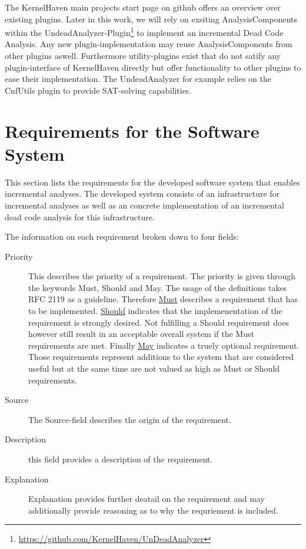 \documentclass[a4paper]{article}
\begin{document}
The KernelHaven main projects start page on github offers an overview over existing plugins. Later in this work, we will rely on exsiting AnalysisComponents within the UndeadAnalyzer-Plugin\footnote{\url{https://github.com/KernelHaven/UnDeadAnalyzer}} to implement an incremental Dead Code Analysis. Any new plugin-implementation may reuse AnalysisComponents from other plugins aswell. Furthermore utility-plugins exist that do not satify any plugin-interface of KernelHaven directly but offer functionality to other plugins to ease their implementation. The UndeadAnalyzer for example relies on the CnfUtils plugin to provide SAT-solving capabilities.

\newpage
\section{Requirements for the Software System}

This section lists the requirements for the developed software system that enables incremental analyses. The developed system consists of an infrastructure for incremental analyses as well as an concrete implementation of an incremental dead code analysis for this infrastructure.

The information on each requirement broken down to four fields:

\begin{description}
    \item [Priority]
	This describes the priority of a requirement. The priority is given through the keywords Must, Should and May. The usage of the definitions takes RFC 2119 \cite{RFC-bum} as a guideline. Therefore \underline{Must} describes a requirement that has to be implemented. \underline{Should} indicates that the implemenentation of the requirement is strongly desired. Not fulfilling a Should requirement  does however still result in an acceptable overall system if the Must requirements are met. Finally \underline{May} indicates a truely optional requirement. Those requirements represent additions to the system that are considered useful but at the same time are not valued as high as Must or Should requirements.
    \item [Source]
    The Source-field describes the origin of the requirement.
    \item [Description]
    this field provides a description of the requirement.
    \item [Explanation]
    Explanation provides further deatail on the requirement and may additionally provide reasoning as to why the requriement is included.
\end{description}
\end{document}
